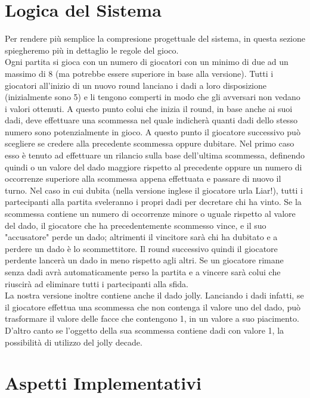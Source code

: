 \documentclass{llncs}
\begin{document}
	\section{Logica del Sistema}
		Per rendere più semplice la compresione progettuale del sistema, in questa sezione spiegheremo più in dettaglio le regole del gioco. \\
		Ogni partita si gioca con un numero di giocatori con un minimo di due ad un massimo di 8 (ma potrebbe essere superiore in base alla versione). Tutti i giocatori all'inizio di un nuovo round lanciano i dadi a loro disposizione (inizialmente sono 5) e li tengono comperti in modo che gli avversari non vedano i valori ottenuti. A questo punto colui che inizia il round, in base anche ai suoi dadi, deve effettuare una scommessa nel quale indicherà quanti dadi dello stesso numero sono potenzialmente in gioco. A questo punto il giocatore successivo può scegliere se credere alla precedente scommessa oppure dubitare. Nel primo caso esso è tenuto ad effettuare un rilancio sulla base dell'ultima scommessa, definendo quindi o un valore del dado maggiore rispetto al precedente oppure un numero di occorrenze superiore alla scommessa appena effettuata e passare di nuovo il turno. Nel caso in cui dubita (nella versione inglese il giocatore urla Liar!), tutti i partecipanti alla partita sveleranno i propri dadi per decretare chi ha vinto. Se la scommessa contiene un numero di occorrenze minore o uguale rispetto al valore del dado, il giocatore che ha precedentemente scommesso vince, e il suo "accusatore" perde un dado; altrimenti il vincitore sarà chi ha dubitato e a perdere un dado è lo scommettitore. Il round successivo quindi il giocatore perdente lancerà un dado in meno rispetto agli altri. Se un giocatore rimane senza dadi avrà automaticamente perso la partita e a vincere sarà colui che riuscirà ad eliminare tutti i partecipanti alla sfida.\\
		La nostra versione inoltre contiene anche il dado jolly. Lanciando i dadi infatti, se il giocatore effettua una scommessa che non contenga il valore uno del dado, può trasformare il valore delle facce che contengono 1, in un valore a suo piacimento. D'altro canto se l'oggetto della sua scommessa contiene dadi con valore 1, la possibilità di utilizzo del jolly decade.
	

	
	\section{Aspetti Implementativi}%
\end{document}
